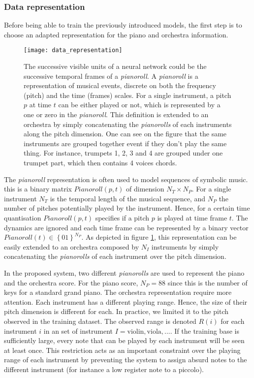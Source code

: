 \documentclass[letterpaper]{article}
\begin{document}
\subsubsection{Data representation}
\label{sec:data_representation}
Before being able to train the previously introduced models, the first step is to choose an adapted representation for the piano and orchestra information.
\begin{figure}
\centering
\texttt{[image: data\_representation]}
\caption{The successive visible units of a neural network could be the successive temporal frames of a \textit{pianoroll}. A \textit{pianoroll} is a representation of musical events, discrete on both the frequency (pitch) and the time (frames) scales. For a single instrument, a pitch $p$ at time $t$ can be either played or not, which is represented by a one or zero in the \textit{pianoroll}. This definition is extended to an orchestra by simply concatenating the \textit{pianorolls} of each instruments along the pitch dimension. One can see on the figure that the same instruments are grouped together event if they don't play the same thing. For instance, trumpets 1, 2, 3 and 4 are grouped under one trumpet part, which then contains 4 voices chords.}
\label{fig:pianoroll}
\end{figure}
The \textit{pianoroll} representation is often used to model sequences of symbolic music.
this is a binary matrix $Pianoroll(p,t)$ of dimension $N_{T} \times N_{P}$.
For a single instrument $N_{T}$ is the temporal length of the musical sequence,  and $N_{P}$ the number of pitches potentially played by the instrument. Hence, for a certain time quantisation $Pianoroll(p,t)$ specifies if a pitch $p$ is played at time frame $t$.
The dynamics are ignored and each time frame can be represented by a binary vector $Pianoroll(t) \in \left\lbrace 0  1 \right\rbrace ^{N_{P}}$.
As depicted in figure \ref{fig:pianoroll}, this representation can be easily extended to an orchestra composed by $N_{I}$ instruments by simply concatenating the \textit{pianorolls} of each instrument over the pitch dimension.

In the proposed system, two different \textit{pianorolls} are used to represent the piano and the orchestra score.
For the piano score, $N_{P} = 88$ since this is the number of keys for a standard grand piano.
The orchestra representation require more attention. Each instrument has a different playing range. Hence, the size of their pitch dimension is different for each. In practice, we limited it to the pitch observed in the training dataset. The observed range is denoted $R(i)$ for each instrument $i$ in an set of instrument $I = {\text{violin},\text{viola},...}$. If the training base is sufficiently large, every note that can be played by each instrument will be seen at least once. This restriction acts as an important constraint over the playing range of each instrument by preventing the system to assign absurd notes to the different instrument (for instance a low register note to a piccolo).
\end{document}
